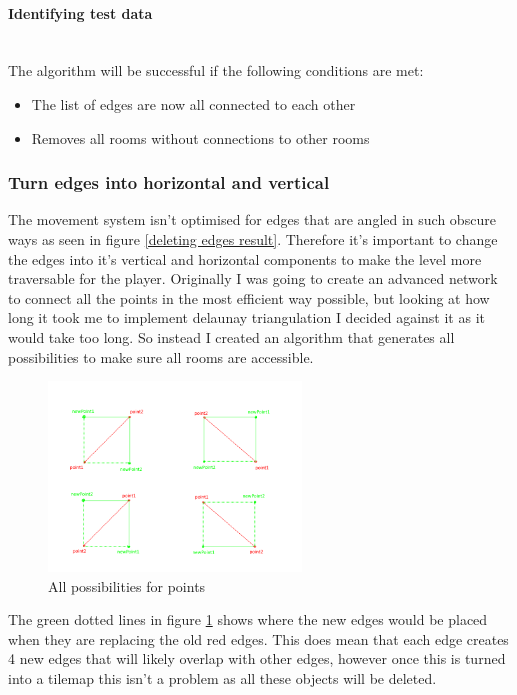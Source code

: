 \documentclass{article}
\newcommand{\myparagraph}[1]{\paragraph{#1}\mbox{}\\} %
\begin{document}
\myparagraph{Identifying test data}
The algorithm will be successful if the following conditions are met:
\begin{itemize}
\item{The list of edges are now all connected to each other}
\item{Removes all rooms without connections to other rooms}
\end{itemize}

\subsubsection{Turn edges into horizontal and vertical}
The movement system isn't optimised for edges that are angled in such obscure ways as seen in figure \ref{deleting edges result}. Therefore it's important to change the edges into it's vertical and horizontal components to make the level more traversable for the player. Originally I was going to create an advanced network to connect all the points in the most efficient way possible, but looking at how long it took me to implement delaunay triangulation I decided against it as it would take too long. So instead I created an algorithm that generates all possibilities to make sure all rooms are accessible.

\begin{figure}[h]
\centering
\includegraphics[width = 0.6\textwidth]{point possibilities}
\caption{All possibilities for points}
\label{point possibilities}
\end{figure}

The green dotted lines in figure \ref{point possibilities} shows where the new edges would be placed when they are replacing the old red edges. This does mean that each edge creates 4 new edges that will likely overlap with other edges, however once this is turned into a tilemap this isn't a problem as all these objects will be deleted.
\end{document}
